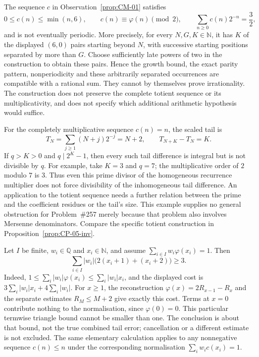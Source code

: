 \begin{obs}\label{prop:CM-02}
The sequence $c$ in Observation~\ref{prop:CM-01} satisfies
\[
 0\le c(n)\le\min(n,6),\qquad
 c(n)\equiv\varphi(n)\pmod2,\qquad
 \sum_{n\ge0}c(n)2^{-n}=\frac32,
\]
and is not eventually periodic. More precisely, for every
$N,G,K\in\mathbb N$, it has $K$ of the displayed $(6,0)$ pairs
starting beyond $N$, with successive starting positions separated
by more than $G$. Choose sufficiently late powers of two in the
construction to obtain these pairs.
Hence the growth bound, the exact parity pattern, nonperiodicity and
these arbitrarily separated occurrences are compatible with a rational
sum. They cannot by themselves prove irrationality. The construction
does not preserve the complete totient sequence or its
multiplicativity, and does not specify which additional arithmetic
hypothesis would suffice.
\end{obs}

\begin{obs}\label{prop:CP-03-kill}
For the completely multiplicative sequence $c(n)=n$, the scaled tail is
\[
 T_N=\sum_{j\ge1}(N+j)2^{-j}=N+2,
 \qquad T_{N+K}-T_N=K.
\]
If $q>K>0$ and $q\mid2^K-1$, then every such tail difference is
integral but is not divisible by $q$. For example, take $K=3$ and
$q=7$; the multiplicative order of $2$ modulo $7$ is $3$.
Thus even this prime divisor of the homogeneous recurrence multiplier
does not force divisibility of the inhomogeneous tail difference.
An application to the totient sequence needs a further relation between
the prime and the coefficient residues or the tail's size. This
example supplies no general obstruction for Problem~\#257 merely
because that problem also involves Mersenne denominators. Compare the
specific totient construction in Proposition~\ref{prop:CP-05-inv}.
\end{obs}

\begin{obs}\label{prop:CP-04-kill}
Let $I$ be finite, $w_i\in\mathbb Q$ and $x_i\in\mathbb N$, and
assume $\sum_{i\in I}w_i\varphi(x_i)=1$. Then
\[
 \sum_{i\in I}|w_i|\bigl(2(x_i+1)+(x_i+2)\bigr)\ge3.
\]
Indeed,
$1\le\sum_i|w_i|\varphi(x_i)\le\sum_i|w_i|x_i$,
and the displayed cost is $3\sum_i|w_i|x_i+4\sum_i|w_i|$.
For $x\ge1$, the reconstruction
$\varphi(x)=2R_{x-1}-R_x$ and the separate estimates
$R_M\le M+2$ give exactly this cost. Terms at $x=0$ contribute
nothing to the normalisation, since $\varphi(0)=0$.
This particular termwise triangle bound cannot be smaller than one.
The conclusion is about that bound, not the true combined tail error;
cancellation or a different estimate is not excluded. The same elementary
calculation applies to any nonnegative sequence $c(n)\le n$ under
the corresponding normalisation $\sum_iw_i c(x_i)=1$.
\end{obs}

